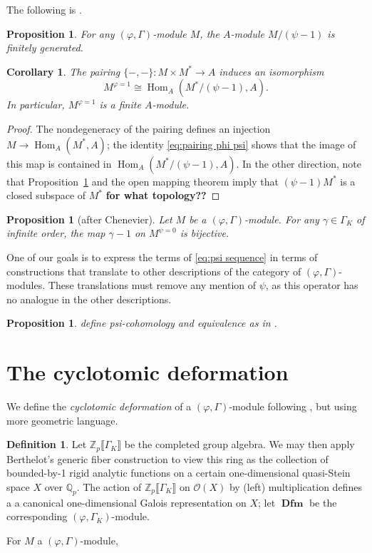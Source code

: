 \documentclass[12pt]{amsart}
\newtheorem{cor}[theorem]{Corollary}
\newtheorem{prop}[theorem]{Proposition}
\theoremstyle{definition}
\newtheorem{defn}[theorem]{Definition}
\numberwithin{equation}{theorem}
\newcommand{\QQ}{\mathbb{Q}}
\newcommand{\ZZ}{\mathbb{Z}}
\newcommand{\calO}{\mathcal{O}}
\DeclareMathOperator{\Dfm}{\mathbf{Dfm}}
\DeclareMathOperator{\Hom}{Hom}
\begin{document}
The following is \cite[Proposition~3.3.2(1)]{kpx}.
\begin{prop} \label{P:psi finite}
For any $(\varphi, \Gamma)$-module $M$,
the $A$-module $M/(\psi-1)$ is finitely generated.
\end{prop}
\begin{cor}
The pairing $\{-,-\}: M \times M^* \to A$ induces an isomorphism
\[
M^{\varphi=1} \cong \Hom_A(M^*/(\psi-1), A).
\]
In particular, $M^{\varphi=1}$ is a finite $A$-module.
\end{cor}
\begin{proof}
The nondegeneracy of the pairing defines an injection $M \to \Hom_A(M^*, A)$;
the identity \eqref{eq:pairing phi psi} shows that the image of this map is contained in
$\Hom_A(M^*/(\psi-1), A)$. In the other direction, note that Proposition~\ref{P:psi finite} and the open mapping theorem imply that $(\psi-1)M^*$ is a closed subspace of $M^*$
\textbf{for what topology??}
\end{proof}

\begin{prop}[after Chenevier]
Let $M$ be a $(\varphi, \Gamma)$-module.
For any $\gamma \in \Gamma_K$ of infinite order, the map $\gamma-1$ on $M^{\psi=0}$ is bijective.
\end{prop}

One of our goals is to express the terms of \eqref{eq:psi sequence} in terms of constructions that translate to other descriptions of the category of $(\varphi, \Gamma)$-modules. These translations must remove any mention of $\psi$, as this operator has no analogue in the other descriptions.

\begin{prop}
define psi-cohomology and equivalence as in \cite[Definition~2.3.3]{kpx}.
\end{prop}

\section{The cyclotomic deformation}

We define the \emph{cyclotomic deformation} of a $(\varphi, \Gamma)$-module following 
\cite[Definition~4.4.7]{kpx}, but using more geometric language.
\begin{defn}
Let $\ZZ_p \llbracket \Gamma_K \rrbracket$ be the completed group algebra. We may then apply Berthelot's generic fiber construction to view this ring as the collection of bounded-by-1 rigid analytic functions on a certain one-dimensional quasi-Stein space $X$ over $\QQ_p$.
The action of $\ZZ_p \llbracket \Gamma_K \rrbracket$ on $\calO(X)$ by (left) multiplication
defines a a canonical one-dimensional Galois representation on $X$; let $\Dfm$ be the corresponding $(\varphi, \Gamma_K)$-module.

For $M$ a $(\varphi, \Gamma)$-module, 
\end{defn}
\end{document}
